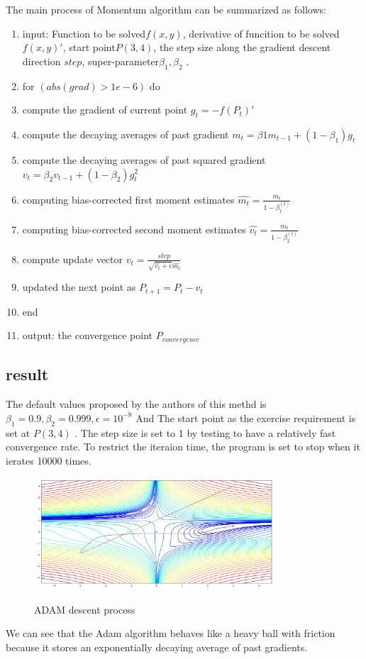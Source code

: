\documentclass[aps,letterpaper,10pt]{article}
\begin{document}
  The main process of Momentum algorithm can be summarized as follows:

  \begin{enumerate}
  	\item input: Function to be solved$f(x,y)$, derivative of funcition to be solved${f(x,y)}'$, start point$P(3,4)$, the step size along the gradient descent direction $step$, super-parameter$\beta_1,\beta_2$ .
  	\item for $(abs(grad)> 1e-6)$ do
  	\item compute the gradient of current point $g_t=-{f(P_t)}'$
    \item compute the decaying averages of past gradient $m_t=\beta1 m_{t-1} +(1-\beta_1)g_t$
    \item compute the decaying averages of past squared gradient $v_t=\beta_2 v_{t-1} +(1-\beta_2)g_t^{2}$
    \item computing bias-corrected first moment estimates $\hat{m_t}=\frac{m_t}{1-\beta_1^(t)}$
    \item computing bias-corrected second moment estimates $\hat{v_t}=\frac{m_t}{1-\beta_2^(t)}$
    \item compute update vector $v_t=\frac{step}{\sqrt{\hat{v_t}+\epsilon}\hat{m_t}} $
    \item updated the next point as $P_{t+1}=P_t - v_t$
    \item end
  	\item output: the convergence point $P_{convergence}$
  \end{enumerate}




  \subsection{result}
  The default values proposed by the authors of this methd is $\beta_1=0.9, \beta_2=0.999, \epsilon=10^{-8}$
  And The start point as the exercise requirement is set at $P(3,4)$ . The step size is set to 1 by testing to have a relatively fast convergence rate. To restrict the iteraion time, the program is set to stop when it ierates 10000 times.

    \begin{figure}[H]
    	 \centering
    	 \label{fig:adam}\includegraphics[width=0.8\textwidth]{adam.png}\
    	 \caption{ADAM descent process}
    \end{figure}
  We can see that the Adam algorithm behaves like a heavy ball with friction because it stores an exponentially decaying average of past gradients.
\end{document}
